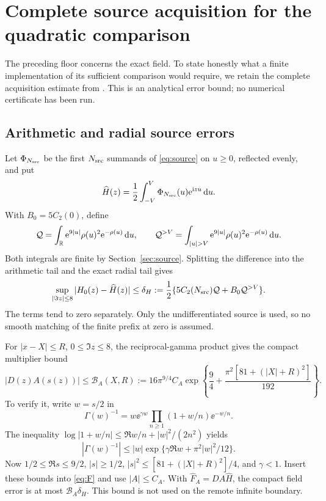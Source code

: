 \section{Complete source acquisition for the quadratic comparison}\label{sec:acquisition}

The preceding floor concerns the exact field. To state honestly what
a finite implementation of its sufficient comparison would require,
we retain the complete acquisition estimate from
\cite{OGMollifier,OGCorrection}. This is an analytical error bound;
no numerical certificate has been run.

\subsection{Arithmetic and radial source errors}

Let \(\Phi_{N_{\rm src}}\) be the first \(N_{\rm src}\) summands of
\eqref{eq:source} on \(u\ge0\), reflected evenly, and put
\[
 \widehat H(z)=\frac12\int_{-V}^{V}
          \Phi_{N_{\rm src}}(u)\mathrm e^{\mathrm i zu}\,\mathrm d u.
\]
With \(B_0=5C_2(0)\), define
\[
 \mathcal Q=\int_\R\ee^{9|u|}\rho(u)^2\ee^{-\rho(u)}\dd u,\qquad
 \mathcal Q^{>V}=\int_{|u|>V}\ee^{9|u|}
                      \rho(u)^2\ee^{-\rho(u)}\dd u.
\]
Both integrals are finite by Section~\ref{sec:source}. Splitting the
difference into the arithmetic tail and the exact radial tail gives
\begin{equation}\label{eq:delta-H}
 \sup_{|\Im z|\le8}|H_0(z)-\widehat H(z)|
 \le\delta_H:=\frac12\{5C_2(N_{\rm src})\mathcal Q+
                          B_0\mathcal Q^{>V}\}.
\end{equation}
The terms tend to zero separately. Only the undifferentiated source
is used, so no smooth matching of the finite prefix at zero is assumed.

For \(|x-X|\le R\), \(0\le\Im z\le8\), the reciprocal-gamma
product \cite{DLMFReciprocalGammaOC} gives the compact multiplier bound
\begin{equation}\label{eq:multiplier}
 |D(z)A(s(z))|\le\mathcal B_A(X,R)
 :=16\pi^{9/4}C_A
 \exp\left\{\frac94+\frac{\pi^2[81+(|X|+R)^2]}{192}\right\}.
\end{equation}
To verify it, write \(w=s/2\) in
\[
 \Gamma(w)^{-1}=w\ee^{\gamma w}
        \prod_{n\ge1}(1+w/n)\ee^{-w/n}.
\]
The inequality
\(\log|1+w/n|\le\Re w/n+|w|^2/(2n^2)\) yields
\[
 |\Gamma(w)^{-1}|
 \le|w|\exp\{\gamma\Re w+\pi^2|w|^2/12\}.
\]
Now \(1/2\le\Re s\le9/2\), \(|s|\ge1/2\),
\(|s|^2\le[81+(|X|+R)^2]/4\), and \(\gamma<1\).
Insert these bounds into \eqref{eq:F} and use \(|A|\le C_A\).
With \(\widehat F_A=DA\widehat H\), the compact field error is at
most \(\mathcal B_A\delta_H\).
This bound is not used on the remote infinite boundary.


